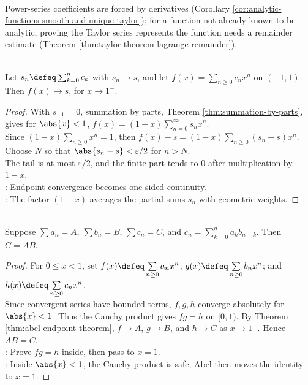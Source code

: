 \begin{perspective} \label{per:taylor-coefficients-need-a-remainder} \\
Power-series coefficients are forced by derivatives (Corollary \ref{cor:analytic-functions-smooth-and-unique-taylor}); for a function not already known to be analytic, proving the Taylor series represents the function needs a remainder estimate (Theorem \ref{thm:taylor-theorem-lagrange-remainder}).
\end{perspective}

\begin{theorem} \label{thm:abel-endpoint-theorem} \\
Let $s_n\defeq\sum_{k=0}^{n}c_k$ with $s_n\to s$, and let $f(x)=\sum_{n\ge0}c_nx^n$ on $(-1,1)$. Then $f(x)\to s$, for $x\to1^-$.
\begin{proof}
With $s_{-1}=0$, summation by parts, Theorem \ref{thm:summation-by-parts}, gives for $\abs{x}<1$, $f(x)=(1-x)\sum\limits_{n=0}^{\infty}s_nx^n$.\\
Since $(1-x)\sum\limits_{n\ge0}x^n=1$, then $f(x)-s=(1-x)\sum\limits_{n\ge0}(s_n-s)x^n$. Choose $N$ so that $\abs{s_n-s}<\varepsilon/2$ for $n>N$.\\
The tail is at most $\varepsilon/2$, and the finite part tends to $0$ after multiplication by $1-x$.\\
: Endpoint convergence becomes one-sided continuity.\\
: The factor $(1-x)$ averages the partial sums $s_n$ with geometric weights.
\end{proof}
\end{theorem}

\begin{theorem} \label{thm:abel-product-theorem} \\
Suppose $\sum a_n=A$, $\sum b_n=B$, $\sum c_n=C$, and $c_n=\sum\limits_{k=0}^{n}a_kb_{n-k}$. Then $C=AB$.
\begin{proof}
For $0\leq x<1$, set $f(x)\defeq\sum\limits_{n\ge0}a_nx^n$; $g(x)\defeq\sum\limits_{n\ge0}b_nx^n$; and $h(x)\defeq\sum\limits_{n\ge0}c_nx^n$.\\
Since convergent series have bounded terms, $f,g,h$ converge absolutely for $\abs{x}<1$. Thus the Cauchy product gives $fg=h$ on $[0,1)$. By Theorem \ref{thm:abel-endpoint-theorem}, $f\to A$, $g\to B$, and $h\to C$ as $x\to1^-$. Hence $AB=C$.\\
: Prove $fg=h$ inside, then pass to $x=1$.\\
: Inside $\abs{x}<1$, the Cauchy product is safe; Abel then moves the identity to $x=1$.
\end{proof}
\end{theorem}

